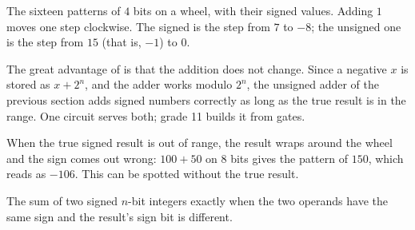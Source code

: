 \begin{omfigure}

{\small The sixteen patterns of $4$ bits on a wheel, with their signed values. Adding $1$ moves one step clockwise.
The signed  is the step from $7$ to $-8$; the unsigned one is the step from $15$ (that is, $-1$) to $0$.}
\end{omfigure}

The great advantage of  is that the addition does not change. Since a negative $x$ is stored as
$x + 2^n$, and the adder works modulo $2^n$, the unsigned adder of the previous section adds signed numbers
correctly as long as the true result is in the range. One circuit serves both; grade 11 builds it from gates.

When the true signed result is out of range, the result wraps around the wheel and the sign comes out wrong:
$100 + 50$ on $8$ bits gives the pattern of $150$, which reads as $-106$. This can be spotted without the true
result.

\begin{proposition}\label{prop:g10:machine-integers:signed-overflow}
The sum of two signed $n$-bit integers  exactly when the two operands have the same sign and the result's
sign bit is different.
\end{proposition}

